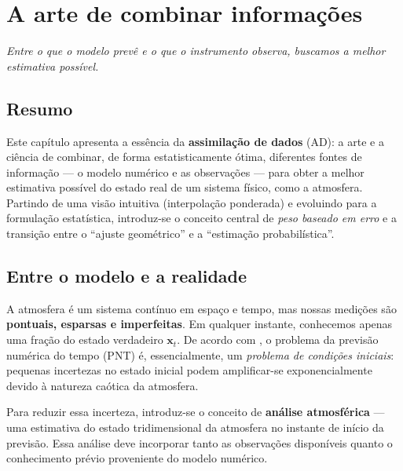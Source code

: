
\chapter{A arte de combinar informações}

\begin{center}
\textit{Entre o que o modelo prevê e o que o instrumento observa, buscamos a melhor estimativa possível.}
\end{center}

\section*{Resumo}
Este capítulo apresenta a essência da \textbf{assimilação de dados} (AD): a arte e a ciência de combinar, de forma estatisticamente ótima, diferentes fontes de informação --- o modelo numérico e as observações --- para obter a melhor estimativa possível do estado real de um sistema físico, como a atmosfera.  
Partindo de uma visão intuitiva (interpolação ponderada) e evoluindo para a formulação estatística, introduz-se o conceito central de \textit{peso baseado em erro} e a transição entre o ``ajuste geométrico'' e a ``estimação probabilística''.

\section{Entre o modelo e a realidade}

A atmosfera é um sistema contínuo em espaço e tempo, mas nossas medições são \textbf{pontuais, esparsas e imperfeitas}.  
Em qualquer instante, conhecemos apenas uma fração do estado verdadeiro \( \mathbf{x}_t \).  
De acordo com \citet{Lorenc1986}, o problema da previsão numérica do tempo (PNT) é, essencialmente, um \textit{problema de condições iniciais}: pequenas incertezas no estado inicial podem amplificar-se exponencialmente devido à natureza caótica da atmosfera.  

\medskip
Para reduzir essa incerteza, introduz-se o conceito de \textbf{análise atmosférica} --- uma estimativa do estado tridimensional da atmosfera no instante de início da previsão.  
Essa análise deve incorporar tanto as observações disponíveis quanto o conhecimento prévio proveniente do modelo numérico.

